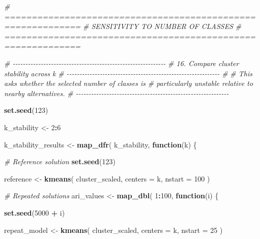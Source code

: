 \documentclass[
]{article}
\newenvironment{Shaded}{\begin{snugshade}}{\end{snugshade}}
\newcommand{\AttributeTok}[1]{\textcolor[rgb]{0.13,0.29,0.53}{#1}}
\newcommand{\CommentTok}[1]{\textcolor[rgb]{0.56,0.35,0.01}{\textit{#1}}}
\newcommand{\ControlFlowTok}[1]{\textcolor[rgb]{0.13,0.29,0.53}{\textbf{#1}}}
\newcommand{\DecValTok}[1]{\textcolor[rgb]{0.00,0.00,0.81}{#1}}
\newcommand{\FunctionTok}[1]{\textcolor[rgb]{0.13,0.29,0.53}{\textbf{#1}}}
\newcommand{\NormalTok}[1]{#1}
\newcommand{\OtherTok}[1]{\textcolor[rgb]{0.56,0.35,0.01}{#1}}
\newcommand{\SpecialCharTok}[1]{\textcolor[rgb]{0.81,0.36,0.00}{\textbf{#1}}}
\begin{document}
\begin{Shaded}
\begin{Highlighting}[]
\CommentTok{\# ============================================================}
\CommentTok{\# SENSITIVITY TO NUMBER OF CLASSES}
\CommentTok{\# ============================================================}

\CommentTok{\# {-}{-}{-}{-}{-}{-}{-}{-}{-}{-}{-}{-}{-}{-}{-}{-}{-}{-}{-}{-}{-}{-}{-}{-}{-}{-}{-}{-}{-}{-}{-}{-}{-}{-}{-}{-}{-}{-}{-}{-}{-}{-}{-}{-}{-}{-}{-}{-}{-}{-}{-}{-}{-}{-}{-}{-}{-}{-}{-}{-}}
\CommentTok{\# 16. Compare cluster stability across k}
\CommentTok{\# {-}{-}{-}{-}{-}{-}{-}{-}{-}{-}{-}{-}{-}{-}{-}{-}{-}{-}{-}{-}{-}{-}{-}{-}{-}{-}{-}{-}{-}{-}{-}{-}{-}{-}{-}{-}{-}{-}{-}{-}{-}{-}{-}{-}{-}{-}{-}{-}{-}{-}{-}{-}{-}{-}{-}{-}{-}{-}{-}{-}}
\CommentTok{\#}
\CommentTok{\# This asks whether the selected number of classes is}
\CommentTok{\# particularly unstable relative to nearby alternatives.}
\CommentTok{\# {-}{-}{-}{-}{-}{-}{-}{-}{-}{-}{-}{-}{-}{-}{-}{-}{-}{-}{-}{-}{-}{-}{-}{-}{-}{-}{-}{-}{-}{-}{-}{-}{-}{-}{-}{-}{-}{-}{-}{-}{-}{-}{-}{-}{-}{-}{-}{-}{-}{-}{-}{-}{-}{-}{-}{-}{-}{-}{-}{-}}

\FunctionTok{set.seed}\NormalTok{(}\DecValTok{123}\NormalTok{)}

\NormalTok{k\_stability }\OtherTok{\textless{}{-}} \DecValTok{2}\SpecialCharTok{:}\DecValTok{6}

\NormalTok{k\_stability\_results }\OtherTok{\textless{}{-}} \FunctionTok{map\_dfr}\NormalTok{(}
\NormalTok{  k\_stability,}
  \ControlFlowTok{function}\NormalTok{(k) \{}

    \CommentTok{\# Reference solution}
    \FunctionTok{set.seed}\NormalTok{(}\DecValTok{123}\NormalTok{)}

\NormalTok{    reference }\OtherTok{\textless{}{-}} \FunctionTok{kmeans}\NormalTok{(}
\NormalTok{      cluster\_scaled,}
      \AttributeTok{centers =}\NormalTok{ k,}
      \AttributeTok{nstart =} \DecValTok{100}
\NormalTok{    )}

    \CommentTok{\# Repeated solutions}
\NormalTok{    ari\_values }\OtherTok{\textless{}{-}} \FunctionTok{map\_dbl}\NormalTok{(}
      \DecValTok{1}\SpecialCharTok{:}\DecValTok{100}\NormalTok{,}
      \ControlFlowTok{function}\NormalTok{(i) \{}

        \FunctionTok{set.seed}\NormalTok{(}\DecValTok{5000} \SpecialCharTok{+}\NormalTok{ i)}

\NormalTok{        repeat\_model }\OtherTok{\textless{}{-}} \FunctionTok{kmeans}\NormalTok{(}
\NormalTok{          cluster\_scaled,}
          \AttributeTok{centers =}\NormalTok{ k,}
          \AttributeTok{nstart =} \DecValTok{25}
\NormalTok{        )}


\end{Highlighting}
\end{Shaded}
\end{document}

